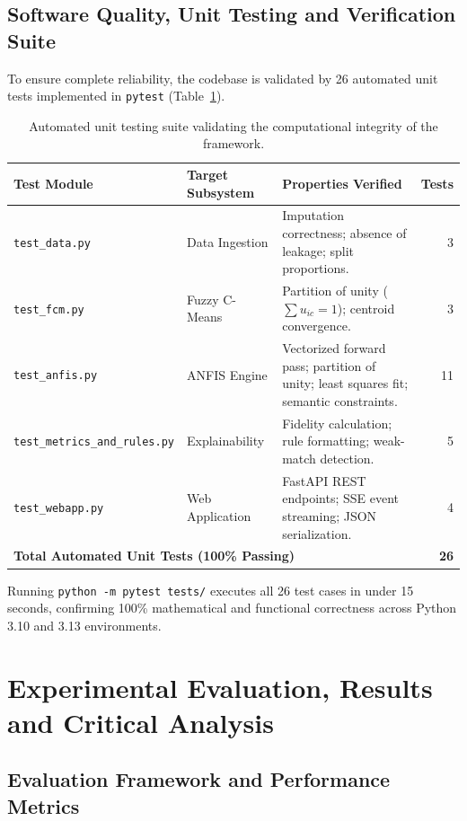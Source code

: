 \documentclass{report}
\begin{document}
\section{Software Quality, Unit Testing and Verification Suite}

To ensure complete reliability, the codebase is validated by 26 automated unit tests implemented in \texttt{pytest} (Table~\ref{tab:unit_tests}).

\begin{table}[htbp]
\centering
\footnotesize
\renewcommand{\arraystretch}{0.80}
\begin{tabularx}{\textwidth}{l l X r}
\toprule
\textbf{Test Module} & \textbf{Target Subsystem} & \textbf{Properties Verified} & \textbf{Tests} \\
\midrule
\texttt{test\_data.py} & Data Ingestion & Imputation correctness; absence of leakage; split proportions. & 3 \\
\texttt{test\_fcm.py} & Fuzzy C-Means & Partition of unity ($\sum u_{ic}=1$); centroid convergence. & 3 \\
\texttt{test\_anfis.py} & ANFIS Engine & Vectorized forward pass; partition of unity; least squares fit; semantic constraints. & 11 \\
\texttt{test\_metrics\_and\_rules.py} & Explainability & Fidelity calculation; rule formatting; weak-match detection. & 5 \\
\texttt{test\_webapp.py} & Web Application & FastAPI REST endpoints; SSE event streaming; JSON serialization. & 4 \\
\midrule
\multicolumn{3}{l}{\textbf{Total Automated Unit Tests (100\% Passing)}} & \textbf{26} \\
\bottomrule
\end{tabularx}
\caption[Automated Unit Testing Suite Verification]{Automated unit testing suite validating the computational integrity of the framework.}
\label{tab:unit_tests}
\end{table}

Running \texttt{python -m pytest tests/} executes all 26 test cases in under 15 seconds, confirming 100\% mathematical and functional correctness across Python 3.10 and 3.13 environments.


\chapter{Experimental Evaluation, Results and Critical Analysis}

\section{Evaluation Framework and Performance Metrics}
\end{document}
